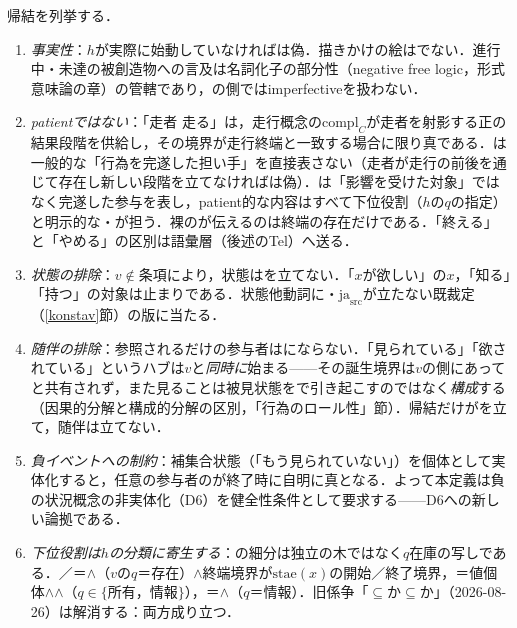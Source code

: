 \documentclass[../../main-detail.tex]{subfiles}
\begin{document}
帰結を列挙する．
\begin{enumerate}
    \item \emph{事実性}：$h$が実際に始動していなければは偽．描きかけの絵はでない．進行中・未達の被創造物への言及は名詞化子の部分性（negative free logic，形式意味論の章）の管轄であり，の側ではimperfectiveを扱わない．
    \item \emph{patientではない}：「走者  走る」は，走行概念の$\mathrm{compl}_C$が走者を射影する正の結果段階を供給し，その境界が走行終端と一致する場合に限り真である．は一般的な「行為を完遂した担い手」を直接表さない（走者が走行の前後を通じて存在し新しい段階を立てなければは偽）．は「影響を受けた対象」ではなく完遂した参与を表し，patient的な内容はすべて下位役割（$h$の$q$の指定）と明示的な・が担う．裸のが伝えるのは終端の存在だけである．「終える」と「やめる」の区別は語彙層（後述のTel）へ送る．
    \item \emph{状態の排除}：$v\notin$条項により，状態はを立てない．「$x$が欲しい」の$x$，「知る」「持つ」の対象は止まりである．状態他動詞に・$\mathrm{ja}_{\mathrm{src}}$が立たない既裁定（\ref{konstav}節）の版に当たる．
    \item \emph{随伴の排除}：参照されるだけの参与者はにならない．「見られている」「欲されている」というハブは$v$と\emph{同時に}始まる——その誕生境界は$v$の側にあってと共有されず，また見ることは被見状態をで引き起こすのではなく\emph{構成}する（因果的分解と構成的分解の区別，「行為のロール性」節）．帰結だけがを立て，随伴は立てない．
    \item \emph{負イベントへの制約}：補集合状態（「もう見られていない」）を個体として実体化すると，任意の参与者のが終了時に自明に真となる．よって本定義は負の状況概念の非実体化（D6）を健全性条件として要求する——D6への新しい論拠である．
    \item \emph{下位役割は$h$の分類に寄生する}：の細分は独立の木ではなく$q$在庫の写しである．／＝$\land$（$v$の$q$＝存在）$\land$終端境界が$\mathrm{stae}(x)$の開始／終了境界，＝値個体$\land$$\land$（$q\in\{$所有，情報$\}$），＝$\land$（$q$＝情報）．旧係争「$\subseteq$か$\subseteq$か」（2026-08-26）は解消する：両方成り立つ．
\end{enumerate}
\end{document}
